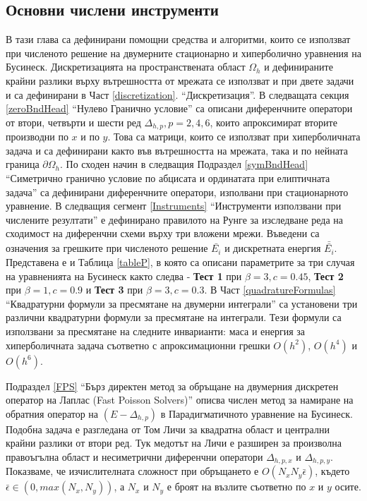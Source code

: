 \documentclass[a4paper]{article}
\theoremstyle{remark}
\begin{document}
\begin{large}
\section{Основни числени инструменти}\label{numaBasic}
В тази глава са дефинирани помощни средства и алгоритми, които се използват при численото решение на двумерните стационарно и хиперболично уравнения на Бусинеск. Дискретизацията на пространствената област $\Omega_h$ и дефинираните крайни разлики върху вътрешността от мрежата се използват и при двете задачи и са дефинирани в Част \ref{discretization}. ``Дискретизация''. В следващата секция \ref{zeroBndHead} ``Нулево Гранично условие'' са описани диференчните оператори от втори, четвърти и шести ред $\Delta_{h,p}, p=2,4,6$, които апроксимират вторите производни по $x$ и по $y$. Това са матрици, които се използват при хиперболичната задача и са дефинирани както във вътрешността на мрежата, така и по нейната граница $\partial \Omega_h$. По сходен начин в следващия Подраздел \ref{symBndHead} ``Симетрично гранично условие по абцисата и ординатата при елиптичната задача'' са дефинирани диференчните оператори, изполвани при стационарното уравнение. В следващия сегмент \ref{Instruments} ``Инструменти използвани при числените резултати'' е дефинирано правилото на Рунге за изследване реда на сходимост на диференчни схеми върху три вложени мрежи. Въведени са означения за грешките при численото решение $\bar{ E_i}$ и дискретната енергия $\bar{\bar{ E_i}}$. Представена е и Таблица \ref{tableP}, в която са описани параметрите за три случая на уравненията на Бусинеск както следва - \textbf{Тест 1} при $\beta = 3, c=0.45$, \textbf{Тест 2} при $\beta = 1, c=0.9$ и \textbf{Тест 3} при $\beta = 3, c=0.3$. В Част \ref{quadratureFormulas} ``Квадратурни формули за пресмятане на двумерни интеграли'' са установени три различни квадратурни формули за пресмятане на интеграли. Тези формули са използвани за пресмятане на следните инварианти: маса и енергия за хиперболичната задача съответно с апроксимационни грешки $O(h^2)$, $O(h^4)$ и $O(h^6)$.  

Подраздел \ref{FPS} ``Бърз директен метод за обръщане на двумерния дискретен оператор на Лаплас (Fast Poisson Solvers)'' описва числен метод за намиране на обратния оператор на $(E-\Delta_{h,p})$ в Парадигматичното уравнение на Бусинеск. Подобна задача е разгледана от Том Личи за квадратна област и централни крайни разлики от втори ред. Тук медотът на Личи е разширен за произволна правоъгълна област и несиметрични диференчни оператори $\Delta_{h,p,x}$ и $\Delta_{h,p,y}$. Показваме, че изчислителната сложност при обръщането е $O(N_x N_y \bar{\epsilon})$, където $\bar{\epsilon} \in (0, max(N_x, N_y))$, а $N_x$ и $N_y$ е броят на възлите съответно по $x$ и $y$ осите.


\end{large}
\end{document}
